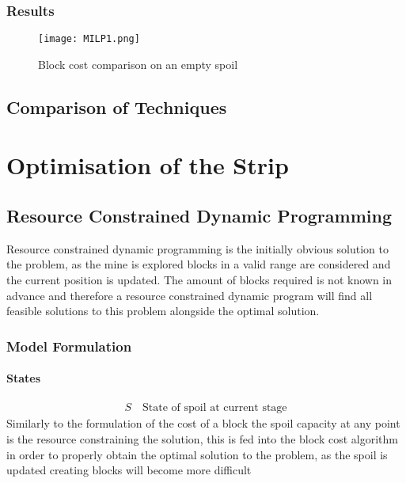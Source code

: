 \subsubsection{Results}
\begin{figure}[h]
\caption{Block cost comparison on an empty spoil}
\label{DP1}
\texttt{[image: MILP1.png]}
\end{figure}


\subsection{Comparison of Techniques}

\section{Optimisation of the Strip}
\subsection{Resource Constrained Dynamic Programming}
Resource constrained dynamic programming is the initially obvious solution to the problem, as the mine is explored blocks in a valid range are considered and the current position is updated. The amount of blocks required is not known in advance and therefore a resource constrained dynamic program will find all feasible solutions to this problem alongside the optimal solution. 
\subsubsection{Model Formulation}
\paragraph*{States}
\begin{align}
\label{Stte}
S \quad \text{State of spoil at current stage}
\end{align}
Similarly to the formulation of the cost of a block the spoil capacity at any point is the resource constraining the solution, this is fed into the block cost algorithm in order to properly obtain the optimal solution to the problem, as the spoil is updated creating blocks will become more difficult 
